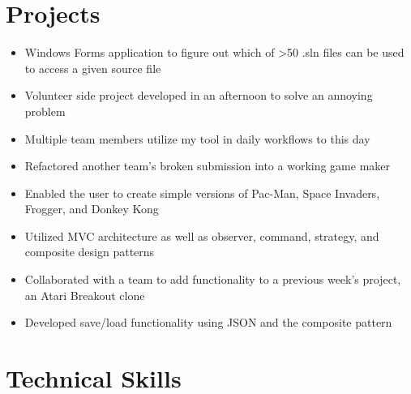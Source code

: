 \documentclass[11pt,a4paper,sans]{moderncv}
\begin{document}
\section{Projects}
\begin{itemize}
\item Windows Forms application to figure out which of >50 .sln files can be used to access a given source file 
\item Volunteer side project developed in an afternoon to solve an annoying problem
\item Multiple team members utilize my tool in daily workflows to this day
\end{itemize}

\begin{itemize}
\item Refactored another team's broken submission into a working game maker
\item Enabled the user to create simple versions of Pac-Man, Space Invaders, Frogger, and Donkey Kong
\item Utilized MVC architecture as well as observer, command, strategy, and composite design patterns
\end{itemize}
\begin{itemize}
\item Collaborated with a team to add functionality to a previous week’s project, an Atari Breakout clone
\item Developed save/load functionality using JSON and the composite pattern
\end{itemize}

\section{Technical Skills}
\end{document}
